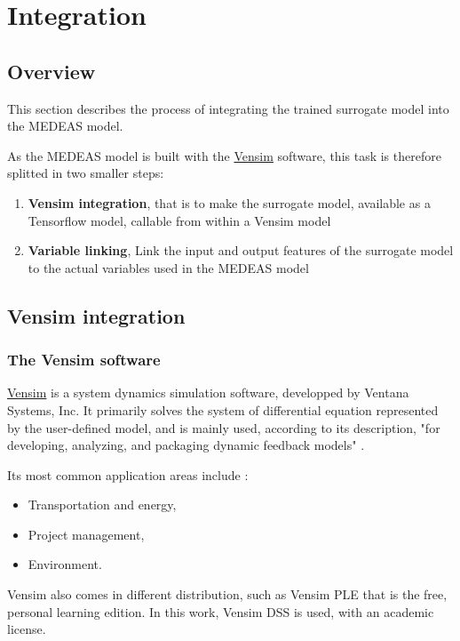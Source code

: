 \section{Integration}

\subsection{Overview}

This section describes the process of integrating the trained surrogate model into the MEDEAS model.

As the MEDEAS model is built with the \href{https://vensim.com/}{Vensim} software, this task is therefore splitted in two smaller steps:
\begin{enumerate}
    \item \textbf{Vensim integration}, that is to make the surrogate model, available as a Tensorflow model, callable from within a Vensim model
    \item \textbf{Variable linking}, Link the input and output features of the surrogate model to the actual variables used in the MEDEAS model
\end{enumerate}

\subsection{Vensim integration}

\subsubsection{The Vensim software}

\href{https://vensim.com/}{Vensim} is a system dynamics simulation software, developped by Ventana Systems, Inc. It primarily solves the system of differential equation represented by the user-defined model, and is mainly used, according to its description, "for developing, analyzing, and packaging dynamic feedback models" \cite{vensim-website}.

Its most common application areas include \cite{wiki-vensim}:
\begin{itemize}
    \item Transportation and energy,
    \item Project management,
    \item Environment.
\end{itemize}

Vensim also comes in different distribution, such as Vensim PLE that is the free, personal learning edition. In this work, Vensim DSS is used, with an academic license.

